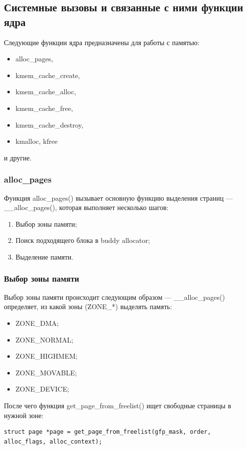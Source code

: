 \subsection{Системные вызовы и связанные с ними функции ядра}

Следующие функции ядра предназначены для работы с памятью:
\begin{itemize}
    \item alloc\_pages,
    \item kmem\_cache\_create,
    \item kmem\_cache\_alloc,
    \item kmem\_cache\_free,
    \item kmem\_cache\_destroy,
    \item kmalloc, kfree
\end{itemize}
и другие.

\subsubsection{alloc\_pages}

Функция alloc\_pages() вызывает основную функцию выделения страниц --- \_\_alloc\_pages(), которая выполняет несколько шагов:
\begin{enumerate}
    \item Выбор зоны памяти;
    \item Поиск подходящего блока в buddy allocator;
    \item Выделение памяти.
\end{enumerate}

\subsubsection*{Выбор зоны памяти}

Выбор зоны памяти происходит следующим образом --- \_\_alloc\_pages() определяет, из какой зоны (ZONE\_*) выделять память:
\begin{itemize}
    \item ZONE\_DMA;
    \item ZONE\_NORMAL;
    \item ZONE\_HIGHMEM;
    \item ZONE\_MOVABLE;
    \item ZONE\_DEVICE;
\end{itemize}

После чего функция get\_page\_from\_freelist() ищет свободные страницы в нужной зоне:
\begin{lstlisting}
struct page *page = get_page_from_freelist(gfp_mask, order, alloc_flags, alloc_context);
\end{lstlisting}


